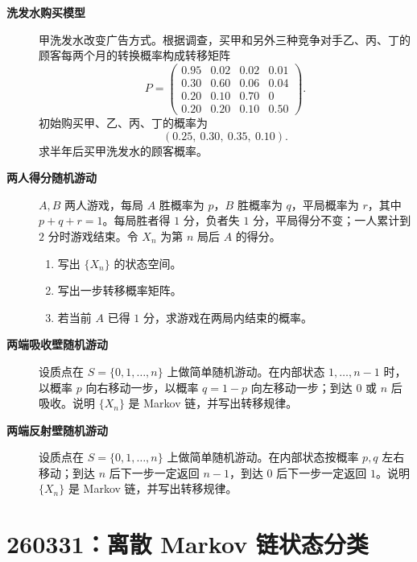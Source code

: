 \documentclass[12pt,a4paper,openany]{ctexrep}
\theoremstyle{definition}
\begin{document}
\begin{description}
	\item[\textbf{洗发水购买模型}] 甲洗发水改变广告方式。根据调查，买甲和另外三种竞争对手乙、丙、丁的顾客每两个月的转换概率构成转移矩阵
	\[
	P=
	\begin{pmatrix}
	0.95&0.02&0.02&0.01\\
	0.30&0.60&0.06&0.04\\
	0.20&0.10&0.70&0\\
	0.20&0.20&0.10&0.50
	\end{pmatrix}.
	\]
	初始购买甲、乙、丙、丁的概率为
	\[
	(0.25,\ 0.30,\ 0.35,\ 0.10).
	\]
	求半年后买甲洗发水的顾客概率。
	\item[\textbf{两人得分随机游动}] $A,B$ 两人游戏，每局 $A$ 胜概率为 $p$，$B$ 胜概率为 $q$，平局概率为 $r$，其中 $p+q+r=1$。每局胜者得 $1$ 分，负者失 $1$ 分，平局得分不变；一人累计到 $2$ 分时游戏结束。令 $X_n$ 为第 $n$ 局后 $A$ 的得分。
	\begin{enumerate}[label=(\arabic*)]
		\item 写出 $\{X_n\}$ 的状态空间。
		\item 写出一步转移概率矩阵。
		\item 若当前 $A$ 已得 $1$ 分，求游戏在两局内结束的概率。
	\end{enumerate}
	\item[\textbf{两端吸收壁随机游动}] 设质点在 $S=\{0,1,\dots,n\}$ 上做简单随机游动。在内部状态 $1,\dots,n-1$ 时，以概率 $p$ 向右移动一步，以概率 $q=1-p$ 向左移动一步；到达 $0$ 或 $n$ 后吸收。说明 $\{X_n\}$ 是 Markov 链，并写出转移规律。
	\item[\textbf{两端反射壁随机游动}] 设质点在 $S=\{0,1,\dots,n\}$ 上做简单随机游动。在内部状态按概率 $p,q$ 左右移动；到达 $n$ 后下一步一定返回 $n-1$，到达 $0$ 后下一步一定返回 $1$。说明 $\{X_n\}$ 是 Markov 链，并写出转移规律。
\end{description}

\section{260331：离散 Markov 链状态分类}
\end{document}

